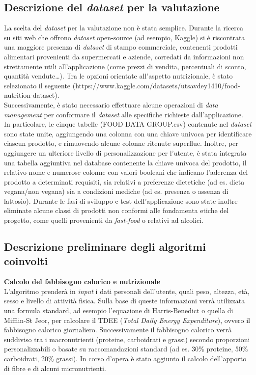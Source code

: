 \documentclass[11pt,a4paper]{article}
\begin{document}
\subsection{Descrizione del \textit{dataset} per la valutazione}
La scelta del \textit{dataset} per la valutazione non è stata semplice. Durante la ricerca su siti web che offrono \textit{dataset} open-source (ad esempio, Kaggle) si è riscontrata una maggiore presenza di \textit{dataset} di stampo commerciale, contenenti prodotti alimentari provenienti da supermercati e aziende, corredati da informazioni non strettamente utili all’applicazione (come prezzi di vendita, percentuali di sconto, quantità vendute…). Tra le opzioni orientate all’aspetto nutrizionale, è stato selezionato il seguente (https://www.kaggle.com/datasets/utsavdey1410/food-nutrition-dataset).\\
Successivamente, è stato necessario effettuare alcune operazioni di \textit{data management} per conformare il \textit{dataset} alle specifiche richieste dall’applicazione. In particolare, le cinque tabelle (FOOD DATA GROUP.csv) contenute nel \textit{dataset} sono state unite, aggiungendo una colonna con una chiave univoca per identificare ciascun prodotto, e rimuovendo alcune colonne ritenute superflue. Inoltre, per aggiungere un ulteriore livello di personalizzazione per l’utente, è stata integrata una tabella aggiuntiva nel database contenente la chiave univoca del prodotto, il relativo nome e numerose colonne con valori booleani che indicano l’aderenza del prodotto a determinati requisiti, sia relativi a preferenze dietetiche (ad es. dieta vegana/non vegana) sia a condizioni mediche (ad es. presenza o assenza di lattosio). Durante le fasi di sviluppo e test dell’applicazione sono state inoltre eliminate alcune classi di prodotti non conformi alle fondamenta etiche del progetto, come quelli provenienti da \textit{fast-food} o relativi ad alcolici.

\subsection{Descrizione preliminare degli algoritmi coinvolti}

\textbf{Calcolo del fabbisogno calorico e nutrizionale}\\
L’algoritmo prenderà in \textit{input} i dati personali dell’utente, quali peso, altezza, età, sesso e livello di attività fisica. Sulla base di queste informazioni verrà utilizzata una formula standard, ad esempio l’equazione di Harris-Benedict o quella di Mifflin-St Jeor, per calcolare il TDEE (\textit{Total Daily Energy Expenditure}), ovvero il fabbisogno calorico giornaliero. Successivamente il fabbisogno calorico verrà suddiviso tra i macronutrienti (proteine, carboidrati e grassi) secondo proporzioni personalizzabili o basate su raccomandazioni standard (ad es. 30\% proteine, 50\% carboidrati, 20\% grassi). In corso d’opera è stato aggiunto il calcolo dell’apporto di fibre e di alcuni micronutrienti.
\end{document}
